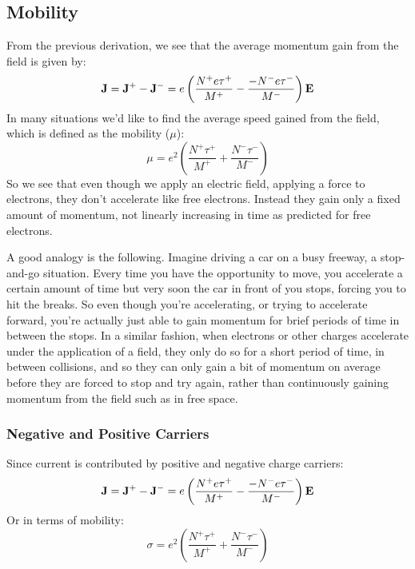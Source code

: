 \subsection{Mobility}


From the previous derivation, we see that the average momentum gain from the field is given by:
\begin{equation}
        {\bf{J}} = {{\bf{J}}^ + } - {{\bf{J}}^ - } = e\left( {\frac{{{N^ + }e{\tau ^ + }}}{{{M^ + }}} - \frac{{ - {N^ - }e{\tau ^ - }}}{{{M^ - }}}} \right){\bf{E}}
\end{equation}
In many situations we’d like to find the average speed gained from the field, which is defined as  the mobility ($\mu$):
\begin{equation}
        \mu  = {e^2}\left( {\frac{{{N^ + }{\tau ^ + }}}{{{M^ + }}} + \frac{{{N^ - }{\tau ^ - }}}{{{M^ - }}}} \right)  
\end{equation}
So we see that even though we apply an electric field, applying a force to electrons, they don't accelerate like free electrons.  Instead they gain only a fixed amount of momentum, not linearly increasing in time as predicted for free electrons.


A good analogy is the following.  Imagine driving a car on a busy freeway, a stop-and-go situation.  Every time you have the opportunity to move, you accelerate a certain amount of time but very soon the car in front of you stops, forcing you to hit the breaks.  So even though you're accelerating, or trying to accelerate forward, you're actually just able to gain momentum for brief periods of time in between the stops.  In a similar fashion, when electrons or other charges accelerate under the application of a field, they only do so for a short period of time, in between collisions, and so they can only gain a bit of  momentum on average before they are forced to stop and try again, rather than continuously gaining momentum from the field such as in free space.


\subsubsection{Negative and Positive Carriers}


Since current is contributed by positive and negative charge carriers:
\begin{equation}
        {\bf{J}} = {{\bf{J}}^ + } - {{\bf{J}}^ - } = e\left( {\frac{{{N^ + }e{\tau ^ + }}}{{{M^ + }}} - \frac{{ - {N^ - }e{\tau ^ - }}}{{{M^ - }}}} \right){\bf{E}}
\end{equation}
Or in terms of mobility:
\begin{equation}
        \sigma  = {e^2}\left( {\frac{{{N^ + }{\tau ^ + }}}{{{M^ + }}} + \frac{{{N^ - }{\tau ^ - }}}{{{M^ - }}}} \right)
\end{equation}






